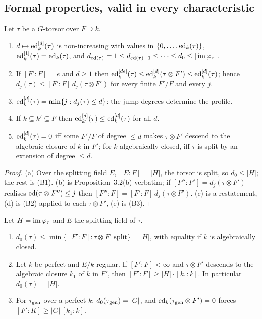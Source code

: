 \subsection{Formal properties, valid in every characteristic}

\begin{proposition}[shape]\label{prop:shape}
Let $\tau$ be a $G$-torsor over $F\supseteq k$.
\begin{enumerate}
\item[(a)] $d\mapsto\operatorname{ed}^{[d]}_k(\tau)$ is non-increasing with values in
$\{0,\dots,\operatorname{ed}_k(\tau)\}$, $\operatorname{ed}^{[1]}_k(\tau)=\operatorname{ed}_k(\tau)$, and
$d_{\operatorname{ed}(\tau)}=1\le d_{\operatorname{ed}(\tau)-1}\le\dots\le d_0\le|\operatorname{im}\varphi_\tau|$.
\item[(b)] If $[F':F]=e$ and $d\ge1$ then $\operatorname{ed}^{[de]}_k(\tau)\le\operatorname{ed}^{[d]}_k(\tau\otimes
F')\le\operatorname{ed}^{[d]}_k(\tau)$; hence $d_j(\tau)\le[F':F]\,d_j(\tau\otimes F')$ for every
finite $F'/F$ and every $j$.
\item[(c)] $\operatorname{ed}^{[d]}_k(\tau)=\min\{j:d_j(\tau)\le d\}$: the jump degrees determine the
profile.
\item[(d)] If $k\subseteq k'\subseteq F$ then $\operatorname{ed}^{[d]}_{k'}(\tau)\le\operatorname{ed}^{[d]}_k(\tau)$
for all $d$.
\item[(e)] $\operatorname{ed}^{[d]}_k(\tau)=0$ iff some $F'/F$ of degree $\le d$ makes $\tau\otimes
F'$ descend to the algebraic closure of $k$ in $F'$; for $k$ algebraically closed, iff
$\tau$ is split by an extension of degree $\le d$.
\end{enumerate}
\end{proposition}

\begin{proof}
(a) Over the splitting field $E$, $[E:F]=|H|$, the torsor is split, so
$d_0\le|H|$; the rest is (B1). (b) is Proposition~3.2(b) verbatim; if
$[F'':F']=d_j(\tau\otimes F')$ realises $\operatorname{ed}(\tau\otimes F'')\le j$ then
$[F'':F]=[F':F]\,d_j(\tau\otimes F')$. (c) is a restatement, (d) is (B2) applied to
each $\tau\otimes F'$, (e) is (B3).
\end{proof}

\begin{proposition}\label{prop:d0}
Let $H=\operatorname{im}\varphi_\tau$ and $E$ the splitting field of $\tau$.
\begin{enumerate}
\item[(a)] $d_0(\tau)\le\min\{[F':F]:\tau\otimes F'\text{ split}\}=|H|$, with
equality if $k$ is algebraically closed.
\item[(b)] Let $k$ be perfect and $E/k$ regular. If $[F':F]<\infty$ and
$\tau\otimes F'$ descends to the algebraic closure $k_1$ of $k$ in $F'$, then
$[F':F]\ge|H|\cdot[k_1:k]$. In particular $d_0(\tau)=|H|$.
\item[(c)] For $\tau_{\mathrm{gen}}$ over a perfect $k$: $d_0(\tau_{\mathrm{gen}})=|G|$, and
$\operatorname{ed}_k(\tau_{\mathrm{gen}}\otimes F')=0$ forces $[F':K]\ge|G|\,[k_1:k]$.
\end{enumerate}
\end{proposition}

